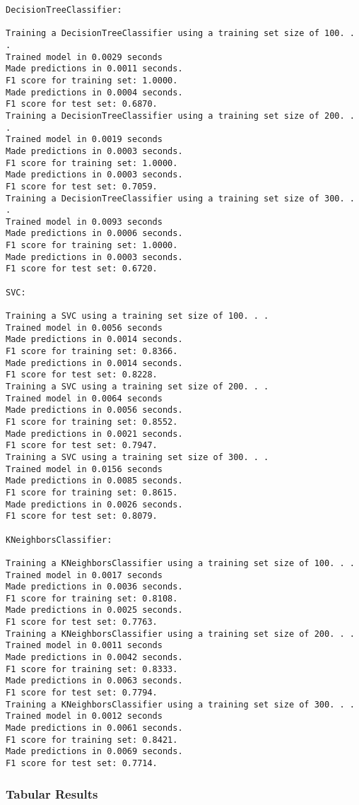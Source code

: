 \documentclass{ctexart}
\begin{document}
    \begin{Verbatim}[commandchars=\\\{\}]
DecisionTreeClassifier: 

Training a DecisionTreeClassifier using a training set size of 100. . .
Trained model in 0.0029 seconds
Made predictions in 0.0011 seconds.
F1 score for training set: 1.0000.
Made predictions in 0.0004 seconds.
F1 score for test set: 0.6870.
Training a DecisionTreeClassifier using a training set size of 200. . .
Trained model in 0.0019 seconds
Made predictions in 0.0003 seconds.
F1 score for training set: 1.0000.
Made predictions in 0.0003 seconds.
F1 score for test set: 0.7059.
Training a DecisionTreeClassifier using a training set size of 300. . .
Trained model in 0.0093 seconds
Made predictions in 0.0006 seconds.
F1 score for training set: 1.0000.
Made predictions in 0.0003 seconds.
F1 score for test set: 0.6720.

SVC: 

Training a SVC using a training set size of 100. . .
Trained model in 0.0056 seconds
Made predictions in 0.0014 seconds.
F1 score for training set: 0.8366.
Made predictions in 0.0014 seconds.
F1 score for test set: 0.8228.
Training a SVC using a training set size of 200. . .
Trained model in 0.0064 seconds
Made predictions in 0.0056 seconds.
F1 score for training set: 0.8552.
Made predictions in 0.0021 seconds.
F1 score for test set: 0.7947.
Training a SVC using a training set size of 300. . .
Trained model in 0.0156 seconds
Made predictions in 0.0085 seconds.
F1 score for training set: 0.8615.
Made predictions in 0.0026 seconds.
F1 score for test set: 0.8079.

KNeighborsClassifier: 

Training a KNeighborsClassifier using a training set size of 100. . .
Trained model in 0.0017 seconds
Made predictions in 0.0036 seconds.
F1 score for training set: 0.8108.
Made predictions in 0.0025 seconds.
F1 score for test set: 0.7763.
Training a KNeighborsClassifier using a training set size of 200. . .
Trained model in 0.0011 seconds
Made predictions in 0.0042 seconds.
F1 score for training set: 0.8333.
Made predictions in 0.0063 seconds.
F1 score for test set: 0.7794.
Training a KNeighborsClassifier using a training set size of 300. . .
Trained model in 0.0012 seconds
Made predictions in 0.0061 seconds.
F1 score for training set: 0.8421.
Made predictions in 0.0069 seconds.
F1 score for test set: 0.7714.
    \end{Verbatim}

    \subsubsection{Tabular Results}\label{tabular-results}
\end{document}
